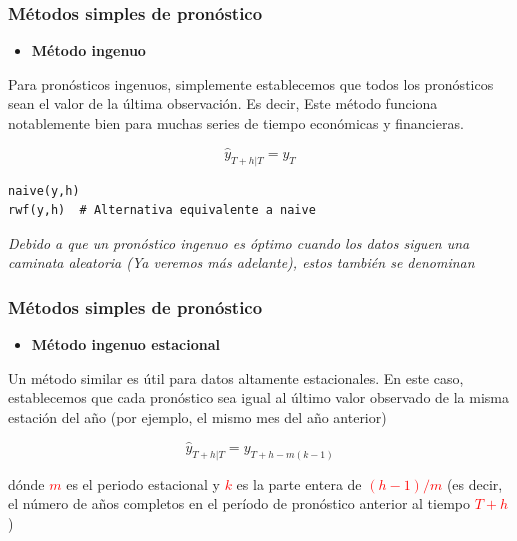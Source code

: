 \documentclass[10pt]{beamer}
\begin{document}



\begin{frame}[fragile]
\frametitle{Métodos simples de pronóstico}


\begin{itemize}
\item \textbf{Método ingenuo}
\end{itemize}


Para pronósticos ingenuos, simplemente establecemos que todos los pronósticos sean el valor de la última observación. Es decir, Este método funciona notablemente bien para muchas series de tiempo económicas y financieras.

\begin{equation}
\hat{y}_{T+h|T} = y_T
\end{equation}


\lstset{language=r,label= ,caption= ,captionpos=b,numbers=none}
\begin{lstlisting}
naive(y,h)
rwf(y,h)  # Alternativa equivalente a naive
\end{lstlisting}

{\scriptsize
\textit{Debido a que un pronóstico ingenuo es óptimo cuando los datos siguen una caminata aleatoria (Ya veremos más adelante), estos también se denominan }
}

\end{frame}





\begin{frame}[fragile]
\frametitle{Métodos simples de pronóstico}


\begin{itemize}
\item \textbf{Método ingenuo estacional}
\end{itemize}

Un método similar es útil para datos altamente estacionales. En este caso, establecemos que cada pronóstico sea igual al último valor observado de la misma estación del año (por ejemplo, el mismo mes del año anterior)

\begin{equation}
\hat{y}_{T+h|T} = y_{T+h-m(k-1)}
\end{equation}

dónde \textcolor{red}{$m$} es el periodo estacional y \textcolor{red}{$k$} es la parte entera de \textcolor{red}{$(h-1)/m$} (es decir, el número de años completos en el período de pronóstico anterior al tiempo \textcolor{red}{$T+h$})


\end{frame}
\end{document}
